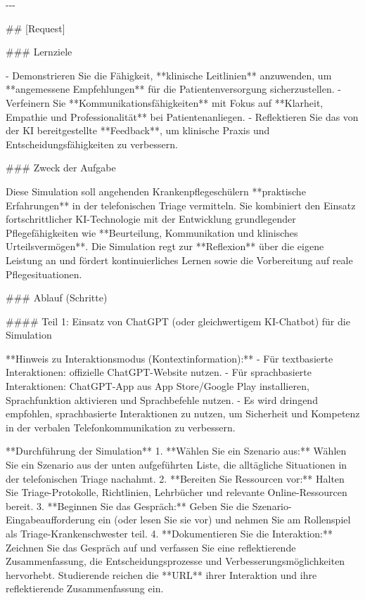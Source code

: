 \documentclass[
  ngerman,
  letterpaper,
  DIV=11]{scrreprt}
\newenvironment{Shaded}{\begin{snugshade}}{\end{snugshade}}
\newcommand{\FunctionTok}[1]{\textcolor[rgb]{0.28,0.35,0.67}{#1}}
\newcommand{\NormalTok}[1]{\textcolor[rgb]{0.00,0.23,0.31}{#1}}
\newcommand{\SpecialStringTok}[1]{\textcolor[rgb]{0.13,0.47,0.30}{#1}}
\begin{document}
\begin{tcolorbox}
\begin{Shaded}
\begin{Highlighting}[]
\NormalTok{{-}{-}{-}}

\FunctionTok{\#\# [Request]}

\FunctionTok{\#\#\# Lernziele}

\SpecialStringTok{{-} }\NormalTok{Demonstrieren Sie die Fähigkeit, **klinische Leitlinien** anzuwenden, um **angemessene Empfehlungen** für die Patientenversorgung sicherzustellen.  }
\SpecialStringTok{{-} }\NormalTok{Verfeinern Sie **Kommunikationsfähigkeiten** mit Fokus auf **Klarheit, Empathie und Professionalität** bei Patientenanliegen.  }
\SpecialStringTok{{-} }\NormalTok{Reflektieren Sie das von der KI bereitgestellte **Feedback**, um klinische Praxis und Entscheidungsfähigkeiten zu verbessern.}

\FunctionTok{\#\#\# Zweck der Aufgabe}

\NormalTok{Diese Simulation soll angehenden Krankenpflegeschülern **praktische Erfahrungen** in der telefonischen Triage vermitteln.  }
\NormalTok{Sie kombiniert den Einsatz fortschrittlicher KI{-}Technologie mit der Entwicklung grundlegender Pflegefähigkeiten wie **Beurteilung, Kommunikation und klinisches Urteilsvermögen**.  }
\NormalTok{Die Simulation regt zur **Reflexion** über die eigene Leistung an und fördert kontinuierliches Lernen sowie die Vorbereitung auf reale Pflegesituationen.}

\FunctionTok{\#\#\# Ablauf (Schritte)}

\FunctionTok{\#\#\#\# Teil 1: Einsatz von ChatGPT (oder gleichwertigem KI{-}Chatbot) für die Simulation}

\NormalTok{**Hinweis zu Interaktionsmodus (Kontextinformation):**}
\SpecialStringTok{{-} }\NormalTok{Für textbasierte Interaktionen: offizielle ChatGPT{-}Website nutzen.  }
\SpecialStringTok{{-} }\NormalTok{Für sprachbasierte Interaktionen: ChatGPT{-}App aus App Store/Google Play installieren, Sprachfunktion aktivieren und Sprachbefehle nutzen.  }
\SpecialStringTok{{-} }\NormalTok{Es wird dringend empfohlen, sprachbasierte Interaktionen zu nutzen, um Sicherheit und Kompetenz in der verbalen Telefonkommunikation zu verbessern.}

\NormalTok{**Durchführung der Simulation**}
\SpecialStringTok{1. }\NormalTok{**Wählen Sie ein Szenario aus:** Wählen Sie ein Szenario aus der unten aufgeführten Liste, die alltägliche Situationen in der telefonischen Triage nachahmt.  }
\SpecialStringTok{2. }\NormalTok{**Bereiten Sie Ressourcen vor:** Halten Sie Triage{-}Protokolle, Richtlinien, Lehrbücher und relevante Online{-}Ressourcen bereit.  }
\SpecialStringTok{3. }\NormalTok{**Beginnen Sie das Gespräch:** Geben Sie die Szenario{-}Eingabeaufforderung ein (oder lesen Sie sie vor) und nehmen Sie am Rollenspiel als Triage{-}Krankenschwester teil.  }
\SpecialStringTok{4. }\NormalTok{**Dokumentieren Sie die Interaktion:** Zeichnen Sie das Gespräch auf und verfassen Sie eine reflektierende Zusammenfassung, die Entscheidungsprozesse und Verbesserungsmöglichkeiten hervorhebt. Studierende reichen die **URL** ihrer Interaktion und ihre reflektierende Zusammenfassung ein.}


\end{Highlighting}
\end{Shaded}
\end{tcolorbox}
\end{document}
